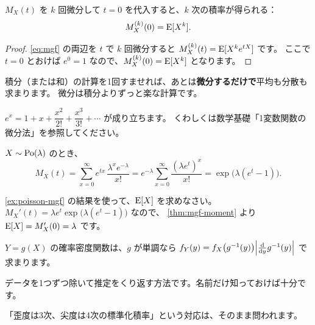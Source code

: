 \begin{theorem}
  $M_X(t)$ を $k$ 回微分して $t=0$ を代入すると、$k$ 次の積率が得られる：
  \[
    M_X^{(k)}(0) = \mathrm{E}[X^k].
  \]
\end{theorem}

\begin{proof}
  \cref{eq:mgf} の両辺を $t$ で $k$ 回微分すると $M_X^{(k)}(t) = \mathrm{E}[X^k e^{tX}]$ です。
  ここで $t=0$ とおけば $e^{0}=1$ なので、$M_X^{(k)}(0)=\mathrm{E}[X^k]$ となります。
\end{proof}

\begin{merit}
  積分（または和）の計算を1回すませれば、あとは\textbf{微分するだけで}平均も分散も求まります。
  微分は積分よりずっと楽な計算です。
\end{merit}

\begin{mathnote}[$e^x$ のテイラー展開]
  $e^x = 1 + x + \dfrac{x^2}{2!} + \dfrac{x^3}{3!} + \cdots$ が成り立ちます。
  くわしくは数学基礎「1変数関数の微分法」を参照してください。
\end{mathnote}

\begin{example}
  $X \sim \mathrm{Po}(\lambda)$ のとき、
  \[
    M_X(t) = \sum_{x=0}^{\infty} e^{tx}\,\frac{\lambda^x e^{-\lambda}}{x!}
           = e^{-\lambda}\sum_{x=0}^{\infty}\frac{(\lambda e^t)^x}{x!}
           = \exp\bigl(\lambda(e^t-1)\bigr).
  \]
\end{example}

\begin{problem}[ポアソン分布の平均]
  \cref{ex:poisson-mgf} の結果を使って、$\mathrm{E}[X]$ を求めなさい。
  \tcblower
  $M_X'(t) = \lambda e^t \exp\bigl(\lambda(e^t-1)\bigr)$ なので、
  \cref{thm:mgf-moment} より $\mathrm{E}[X] = M_X'(0) = \lambda$ です。
\end{problem}

\begin{supplement}[確率変数の変換]
  $Y=g(X)$ の確率密度関数は、$g$ が単調なら $f_Y(y) = f_X\bigl(g^{-1}(y)\bigr)\abs*{\diff{}{y}g^{-1}(y)}$ で求まります。
\end{supplement}

\begin{reference}[ジャックナイフ法]
  データを1つずつ除いて推定をくり返す方法です。名前だけ知っておけば十分です。
\end{reference}

\begin{exampoint}
  「歪度は3次、尖度は4次の標準化積率」という対応は、そのまま問われます。
\end{exampoint}

